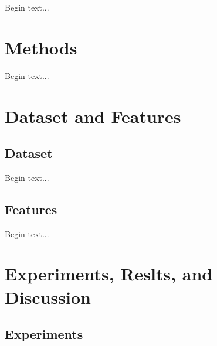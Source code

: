 \documentclass[10pt,twocolumn,letterpaper]{article}
\begin{document}
Begin text...



\section{Methods} %

Begin text...



\section{Dataset and Features} %
\subsection{Dataset}

Begin text...


\subsection{Features}

Begin text...



\section{Experiments, Reslts, and Discussion} %
\subsection{Experiments}
\end{document}
